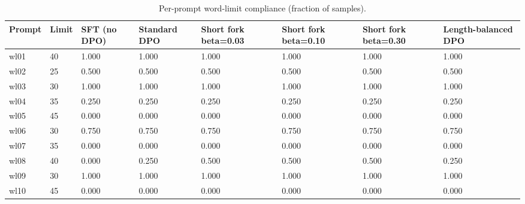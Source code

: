 \begin{table}[t]
\centering
\small
\caption{Per-prompt word-limit compliance (fraction of samples).}
\begin{tabular}{llllllll}
\toprule
Prompt & Limit & SFT (no DPO) & Standard DPO & Short fork beta=0.03 & Short fork beta=0.10 & Short fork beta=0.30 & Length-balanced DPO \\
\midrule
wl01 & 40 & 1.000 & 1.000 & 1.000 & 1.000 & 1.000 & 1.000 \\
wl02 & 25 & 0.500 & 0.500 & 0.500 & 0.500 & 0.500 & 0.500 \\
wl03 & 30 & 1.000 & 1.000 & 1.000 & 1.000 & 1.000 & 1.000 \\
wl04 & 35 & 0.250 & 0.250 & 0.250 & 0.250 & 0.250 & 0.250 \\
wl05 & 45 & 0.000 & 0.000 & 0.000 & 0.000 & 0.000 & 0.000 \\
wl06 & 30 & 0.750 & 0.750 & 0.750 & 0.750 & 0.750 & 0.750 \\
wl07 & 35 & 0.000 & 0.000 & 0.000 & 0.000 & 0.000 & 0.000 \\
wl08 & 40 & 0.000 & 0.250 & 0.500 & 0.500 & 0.500 & 0.250 \\
wl09 & 30 & 1.000 & 1.000 & 1.000 & 1.000 & 1.000 & 1.000 \\
wl10 & 45 & 0.000 & 0.000 & 0.000 & 0.000 & 0.000 & 0.000 \\
\bottomrule
\end{tabular}
\end{table}

